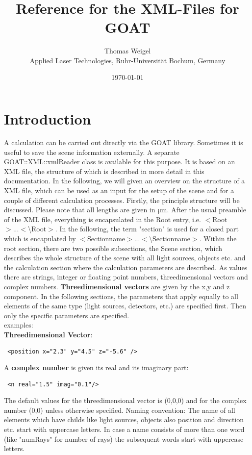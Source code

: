 \documentclass[a4paper,html,11pt,openany]{book}
\begin{document}
  \title{Reference for the XML-Files for GOAT}
  \author{Thomas Weigel\\Applied Laser Technologies, Ruhr-Universit\"at Bochum, Germany}
  \date{\today}
  \maketitle
  \tableofcontents   
  \chapter{Introduction}
A calculation can be carried out directly via the GOAT library. Sometimes it is useful to save the scene information externally. A separate GOAT::XML::xmlReader class is available for this purpose. It is based on an XML file, the structure of which is described in more detail in this documentation. 
  In the following, we will given an overview on the structure of a XML file, which can be used as an input for the setup of the scene and for a couple of different calculation processes. Firstly, the principle structure will be discussed. Please note that all lengths are given in \si{\micro\metre}. After the usual preamble of the XML file, everything is encapsulated in the Root entry, i.e. $<$Root$>...<$\textbackslash Root$>$.   
   In the following, the term "section" is used for a closed part which is encapulated by $<$Sectionname$>...<$\textbackslash Sectionname$>$. Within the root section, there are two possible subsections, the Scene section, which describes the whole structure of the scene with all light sources, objects etc. and the calculation section where the calculation parameters are described. As values there are strings, integer or floating point numbers, threedimensional vectors and complex numbers. \textbf{Threedimensional vectors} are given by the x,y and z component. In the following sections, the parameters that apply equally to all elements of the same type (light sources, detectors, etc.) are specified first. Then only the specific parameters are specified.  \\
   examples: \\   

 \textbf{Threedimensional Vector}:   
    \lstset{language=XML}
 \begin{lstlisting}
 <position x="2.3" y="4.5" z="-5.6" />
   \end{lstlisting}
   A \textbf{complex number} is given its real and its imaginary part: 
 \begin{lstlisting}
 <n real="1.5" imag="0.1"/>
   \end{lstlisting}
  The default values for the threedimensional vector is (0,0,0) and for the complex number (0,0) unless otherwise specified. 
  Naming convention: The name of all elements which have childs like light sources, objects also position and direction etc. start with uppercase letters. In case a name consists of more than one word (like "numRays" for number of rays) the subsequent words start with uppercase letters. 
   
\end{document}
